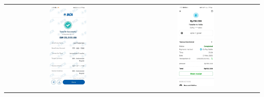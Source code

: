 \begin{table}[htbp]
    \centering
    \begin{tabular}{cc}
        \includegraphics[width=0.3\textwidth]{images/contoh-data/tf-1.jpg} & \includegraphics[width=0.3\textwidth]{images/contoh-data/tf-2.jpg} \\ 
        \vspace{1cm}

\end{tabular}
\end{table}
